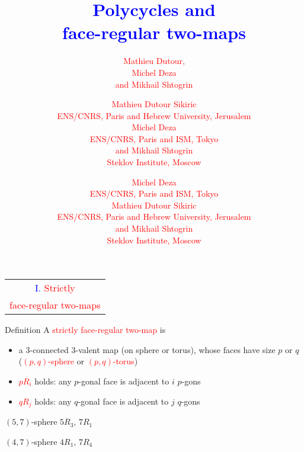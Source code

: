 \documentclass[%
pdf,
colorBG,
slideColor,
]{prosper}
\title{\Huge \textcolor{blue}{Polycycles and}\\[3mm]
\textcolor{blue}{face-regular two-maps}}
\author{
\textcolor{red}{\Large Mathieu Dutour,}\\[2mm]
\textcolor{red}{\Large Michel Deza}\\[2mm]
\textcolor{red}{\Large and Mikhail Shtogrin}\\
}
\author{
\textcolor{red}{\Large Mathieu Dutour Sikiric}\\[2mm]
\textcolor{red}{\large ENS/CNRS, Paris and Hebrew University, Jerusalem}\\[2mm]
\textcolor{red}{\Large Michel Deza}\\[2mm]
\textcolor{red}{\large ENS/CNRS, Paris and ISM, Tokyo}\\[2mm]
\textcolor{red}{\Large and Mikhail Shtogrin}\\[2mm]
\textcolor{red}{\large Steklov Institute, Moscow}
}
\author{
\textcolor{red}{\Large Michel Deza}\\[2mm]
\textcolor{red}{\large ENS/CNRS, Paris and ISM, Tokyo}\\[2mm]
\textcolor{red}{\Large Mathieu Dutour Sikiric}\\[2mm]
\textcolor{red}{\large ENS/CNRS, Paris and Hebrew University, Jerusalem}\\[2mm]
\textcolor{red}{\Large and Mikhail Shtogrin}\\[2mm]
\textcolor{red}{\large Steklov Institute, Moscow}
}
\date{}
\begin{document}
\maketitle

















\begin{slide}{}
\begin{center}
{\Huge 
\begin{tabular*}{9cm}{c}
\\[-0.5cm]
\textcolor{blue}{I. }\textcolor{red}{Strictly}\\
\textcolor{red}{face-regular two-maps}
\end{tabular*}
}
\end{center}
\end{slide}




\begin{slide}{Definition}
\vspace{-3mm}
A \textcolor{red}{strictly face-regular two-map} is 
\begin{itemize}
\item a $3$-connected $3$-valent map (on sphere or torus), whose faces have size $p$ 
or $q$ (\textcolor{red}{$(p,q)$-sphere} or \textcolor{red}{$(p,q)$-torus})
\item \textcolor{red}{$pR_i$} holds: any $p$-gonal face is adjacent to $i$ $p$-gons
\item \textcolor{red}{$qR_j$} holds: any $q$-gonal face is adjacent to $j$ $q$-gons
\end{itemize}

\begin{center}
\begin{minipage}{4.7cm}
\centering
{}\par
$(5,7)$-sphere $5R_3$, $7R_1$
\end{minipage}
\begin{minipage}{4.7cm}
\centering
{}\par
$(4,7)$-sphere $4R_1$, $7R_4$
\end{minipage}

\end{center}
\end{slide}
\end{document}
